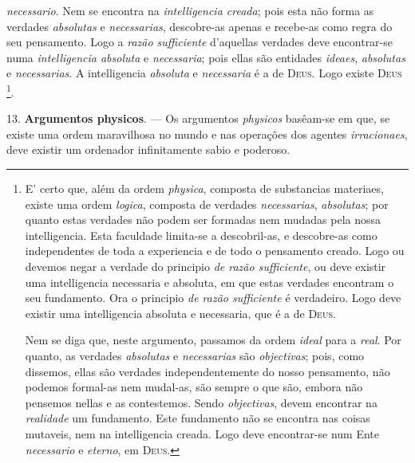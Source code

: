  \emph{necessario}. Nem se encontra na \emph{intelligencia creada}; pois esta não forma as verdades \emph{absolutas} e \emph{necessarias}, descobre-as apenas e recebe-as como regra do seu pensamento. Logo a \emph{razão sufficiente} d'aquellas verdades deve encontrar-se numa \emph{intelligencia absoluta} e \emph{necessaria}; pois ellas são entidades \emph{ideaes}, \emph{absolutas} e \emph{necessarias}. A intelligencia \emph{absoluta} e \emph{necessaria} é a de \textsc{Deus}. Logo existe \textsc{Deus} \footnote{E' certo que, além da ordem \emph{physica}, composta de substancias materiaes, existe uma ordem \emph{logica}, composta de verdades \emph{necessarias}, \emph{absolutas}; por quanto estas verdades não podem ser formadas nem mudadas pela nossa intelligencia. Esta faculdade limita-se a descobril-as, e descobre-as como independentes de toda a experiencia e de todo o pensamento creado. Logo ou devemos negar a verdade do principio \emph{de razão sufficiente}, ou deve existir uma intelligencia necessaria e absoluta, em que estas verdades encontram o seu fundamento. Ora o principio \emph{de razão sufficiente} é verdadeiro. Logo deve existir uma intelligencia absoluta e necessaria, que é a de \textsc{Deus}.\par Nem se diga que, neste argumento, passamos da ordem \emph{ideal} para a \emph{real}. Por quanto, as verdades \emph{absolutas} e \emph{necessarias} são \emph{objectivas}; pois, como dissemos, ellas são verdades independentemente do nosso pensamento, não podemos formal-as nem mudal-as, são sempre o que são, embora não pensemos nellas e as contestemos. Sendo \emph{objectivas}, devem encontrar na \emph{realidade} um fundamento. Este fundamento não se encontra nas coisas mutaveis, nem na intelligencia creada. Logo deve encontrar-se num Ente \emph{necessario} e \emph{eterno}, em \textsc{Deus}.}.

13. \textbf{Argumentos physicos}. --- Os argumentos \emph{physicos} basêam-se em que, se existe uma ordem maravilhosa no mundo e nas operações dos agentes \emph{irracionaes}, deve existir um ordenador infinitamente sabio e poderoso.

